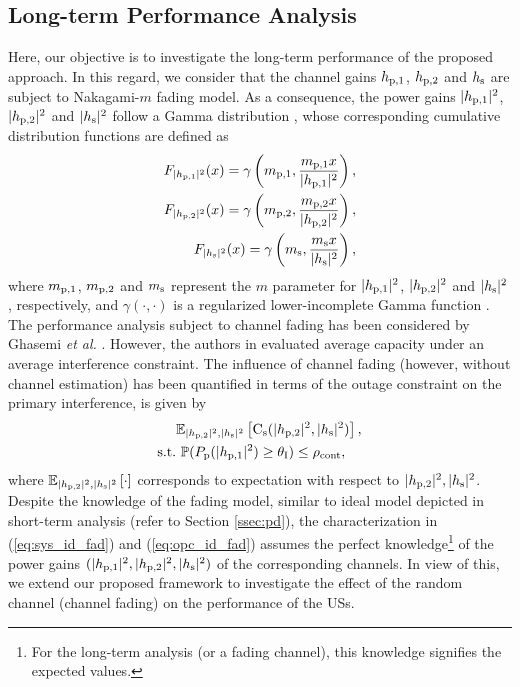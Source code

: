 \subsection{Long-term Performance Analysis}\label{ssec:ltpa}
Here, our objective is to investigate the long-term performance of the proposed approach. In this regard, we consider that the channel gains $h_{\text{p,1}}$, $h_{\text{p,2}}$ and $h_{\text{s}}$ are subject to Nakagami-$m$ fading model. As a consequence, the power gains $|h_{\text{p,1}}|^2$, $|h_{\text{p,2}}|^2$ and $|h_{\text{s}}|^2$ follow a Gamma distribution \cite{Goldsmith05}, whose corresponding cumulative distribution functions are defined as  
\begin{align}
F_{|h_{\text{p,1}}|^2}(x) = \gamma\left(m_{\text{p,1}}, \frac{m_{\text{p,1}} x}{|h_{\text{p,1}}|^2}\right), \label{eq:dis_pgpo}\\
F_{|h_{\text{p,2}}|^2}(x) = \gamma\left(m_{\text{p,2}}, \frac{m_{\text{p,2}} x}{|h_{\text{p,2}}|^2}\right), \label{eq:dis_pgpt}\\  
F_{|h_{\text{s}}|^2}(x) = \gamma\left(m_{\text{s}} , \frac{m_{\text{s}} x}{|h_{\text{s}}|^2}\right), \label{eq:dis_pgs}
\end{align}
where $m_{\text{p,1}}$, $m_{\text{p,2}}$ and $m_{\text{s}}$ represent the $m$ parameter for $|h_{\text{p,1}}|^2$, $|h_{\text{p,2}}|^2$ and $|h_{\text{s}}|^2$, respectively, and $\gamma(\cdot, \cdot)$ is a regularized lower-incomplete Gamma function \cite{abramo}. The performance analysis subject to channel fading has been considered by Ghasemi \textit{et al.} \cite{Ghasemi06, Ghasemi07}. However, the authors in \cite{Ghasemi06, Ghasemi07} evaluated average capacity under an average interference constraint. The influence of channel fading (however, without channel estimation) has been quantified in terms of the outage constraint on the primary interference, is given by %
\begin{align}
	\quad & {\mathbb E}_{|h_{\text{p,2}}|^2, |h_{\text{s}}|^2 }\left[  \text{C}_{\text{s}}(|h_{\text{p,2}}|^2, |h_{\text{s}}|^2) \right] \label{eq:sys_id_fad}, \\
	\text{s.t.} & \text{ } \mathbb P(P_{\text{p}}(|h_{\text{p,1}}|^2) \ge \theta_{\text{I}}) \le \rho_{\text{cont}}, \label{eq:opc_id_fad} 
\end{align}
where ${\mathbb E}_{|h_{\text{p,2}}|^2, |h_{\text{s}}|^2}\left[ \cdot \right]$ corresponds to expectation with respect to $|h_{\text{p,2}}|^2, |h_{\text{s}}|^2$.
Despite the knowledge of the fading model, similar to ideal model depicted in short-term analysis (refer to Section \ref{ssec:pd}), the characterization in (\ref{eq:sys_id_fad}) and (\ref{eq:opc_id_fad}) assumes the perfect knowledge\footnote{For the long-term analysis (or a fading channel), this knowledge signifies the expected values.} of the power gains $(|h_{\text{p,1}}|^2, |h_{\text{p,2}}|^2, |h_{\text{s}}|^2)$ of the corresponding channels. In view of this, we extend our proposed framework to investigate the effect of the random channel (channel fading) on the performance of the USs.

